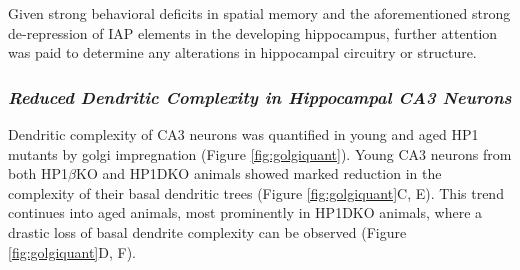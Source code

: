 \documentclass[onehalf,12pt]{beavtex}
\begin{document}
  Given strong behavioral deficits in spatial memory and the
  aforementioned strong de-repression of IAP elements in the developing
  hippocampus, further attention was paid to determine any alterations in
  hippocampal circuitry or structure.
  
  \subsubsection*{\texorpdfstring{\emph{Reduced Dendritic Complexity in
  Hippocampal CA3
  Neurons}}{Reduced Dendritic Complexity in Hippocampal CA3 Neurons}}\label{reduced-dendritic-complexity-in-hippocampal-ca3-neurons}
  
  Dendritic complexity of CA3 neurons was quantified in young and aged HP1
  mutants by golgi impregnation (Figure \ref{fig:golgiquant}). Young CA3
  neurons from both HP1\(\beta\)KO and HP1DKO animals showed marked
  reduction in the complexity of their basal dendritic trees (Figure
  \ref{fig:golgiquant}C, E). This trend continues into aged animals, most
  prominently in HP1DKO animals, where a drastic loss of basal dendrite
  complexity can be observed (Figure \ref{fig:golgiquant}D, F).
  
\end{document}
